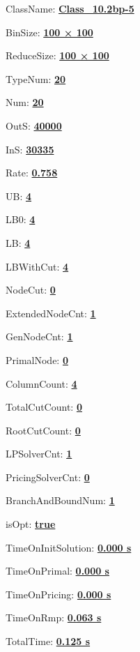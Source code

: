 \documentclass[11pt]{article}
\begin{document}
\pagestyle{empty}


ClassName: \underline{\textbf{Class_10.2bp-5}}
\par
BinSize: \underline{\textbf{100 × 100}}
\par
ReduceSize: \underline{\textbf{100 × 100}}
\par
TypeNum: \underline{\textbf{20}}
\par
Num: \underline{\textbf{20}}
\par
OutS: \underline{\textbf{40000}}
\par
InS: \underline{\textbf{30335}}
\par
Rate: \underline{\textbf{0.758}}
\par
UB: \underline{\textbf{4}}
\par
LB0: \underline{\textbf{4}}
\par
LB: \underline{\textbf{4}}
\par
LBWithCut: \underline{\textbf{4}}
\par
NodeCut: \underline{\textbf{0}}
\par
ExtendedNodeCnt: \underline{\textbf{1}}
\par
GenNodeCnt: \underline{\textbf{1}}
\par
PrimalNode: \underline{\textbf{0}}
\par
ColumnCount: \underline{\textbf{4}}
\par
TotalCutCount: \underline{\textbf{0}}
\par
RootCutCount: \underline{\textbf{0}}
\par
LPSolverCnt: \underline{\textbf{1}}
\par
PricingSolverCnt: \underline{\textbf{0}}
\par
BranchAndBoundNum: \underline{\textbf{1}}
\par
isOpt: \underline{\textbf{true}}
\par
TimeOnInitSolution: \underline{\textbf{0.000 s}}
\par
TimeOnPrimal: \underline{\textbf{0.000 s}}
\par
TimeOnPricing: \underline{\textbf{0.000 s}}
\par
TimeOnRmp: \underline{\textbf{0.063 s}}
\par
TotalTime: \underline{\textbf{0.125 s}}
\par
\newpage


\end{document}

